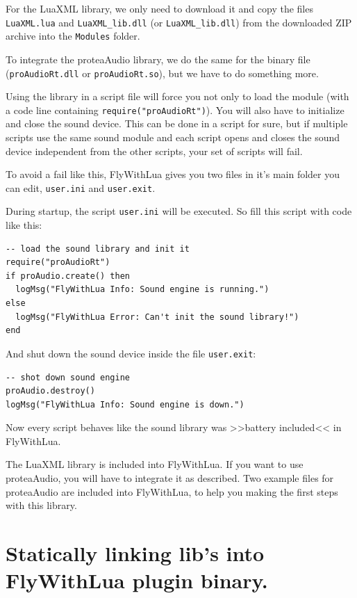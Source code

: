\documentclass[11pt,parskip=half,a4paper]{scrartcl}
\begin{document}
For the LuaXML library, we only need to download it and copy the files \verb|LuaXML.lua| and \verb|LuaXML_lib.dll| (or \verb|LuaXML_lib.dll|) from the downloaded ZIP archive into the \verb|Modules| folder.

To integrate the proteaAudio library, we do the same for the binary file (\verb|proAudioRt.dll| or \verb|proAudioRt.so|), but we have to do something more.

Using the library in a script file will force you not only to load the module (with a code line containing \verb|require("proAudioRt")|). You will also have to initialize and close the sound device. This can be done in a script for sure, but if multiple scripts use the same sound module and each script opens and closes the sound device independent from the other scripts, your set of scripts will fail.

To avoid a fail like this, FlyWithLua gives you two files in it's main folder you can edit, \verb|user.ini| and \verb|user.exit|.

During startup, the script \verb|user.ini| will be executed. So fill this script with code like this:

\begin{lstlisting}[firstnumber=1]
-- load the sound library and init it
require("proAudioRt")
if proAudio.create() then
  logMsg("FlyWithLua Info: Sound engine is running.")
else
  logMsg("FlyWithLua Error: Can't init the sound library!")
end
\end{lstlisting}

And shut down the sound device inside the file \verb|user.exit|:

\begin{lstlisting}[firstnumber=1]
-- shot down sound engine
proAudio.destroy()
logMsg("FlyWithLua Info: Sound engine is down.")
\end{lstlisting}

Now every script behaves like the sound library was >>battery included<< in FlyWithLua. 

The LuaXML library is included into FlyWithLua. If you want to use proteaAudio, you will have to integrate it as described. Two example files for proteaAudio are included into FlyWithLua, to help you making the first steps with this library.

\newpage

\section{Statically linking lib's into FlyWithLua plugin binary. }
\end{document}
